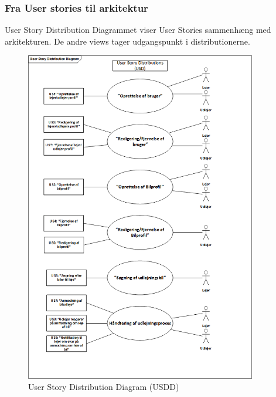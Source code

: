 \documentclass[Arkitektur/System_main.tex]{subfiles}
\begin{document}
\subsubsection{Fra User stories til arkitektur}
User Story Distribution Diagrammet viser User Stories sammenhæng med arkitekturen. De andre views tager udgangspunkt i distributionerne. 
\begin{figure}[H]
    \centering
    \includegraphics[width=0.90\textwidth]{Kravspecifikation/Funktionelle_krav/UserStories/graphics/USDD.png}
    \caption{User Story Distribution Diagram (USDD)}
    \label{fig:USDD}
\end{figure}
\end{document}
